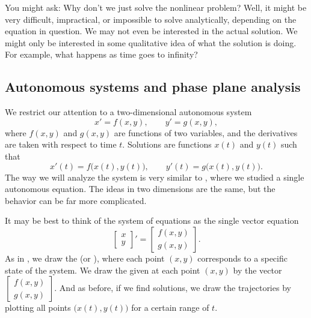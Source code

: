 You might ask: Why don't we just solve the nonlinear problem?  Well, it
might be very difficult, impractical, or impossible to solve analytically,
depending on the equation in question.  We may
not even be interested in the actual solution.
We might only be interested
in some qualitative idea of what the solution is doing.  For example,
what happens as time goes to infinity?


\subsection{Autonomous systems and phase plane analysis}

We restrict our attention to a two-dimensional autonomous system
\begin{equation*}
x' = f(x,y) , \qquad y' = g(x,y) ,
\end{equation*}
where $f(x,y)$ and $g(x,y)$ are functions of two variables, and the
derivatives are taken with respect to time $t$.  Solutions are
functions $x(t)$ and $y(t)$ such that
\begin{equation*}
x'(t) = f\bigl(x(t),y(t)\bigr), \qquad
y'(t) = g\bigl(x(t),y(t)\bigr) .
\end{equation*}
The way we will analyze the system is very similar to
, where we studied a single autonomous equation.  The
ideas in two dimensions are the same, but the behavior can be
far more complicated.

It may be best to think of the system of equations as the single vector equation
\begin{equation} \label{eq:nlinautn2}
\begin{bmatrix} x \\ y \end{bmatrix} ' =
\begin{bmatrix} f(x,y) \\ g(x,y) \end{bmatrix} .
\end{equation}
As in , we draw
the \emph{} (or \emph{}),
where each point $(x,y)$ corresponds to a specific state of the system.
We draw the \emph{}
given at each
point $(x,y)$ by the vector
$\left[ \begin{smallmatrix} f(x,y) \\ g(x,y) \end{smallmatrix} \right]$.
And as before, if we find solutions, we draw the trajectories
by plotting all points $\bigl(x(t),y(t)\bigr)$ for a certain range of $t$.

